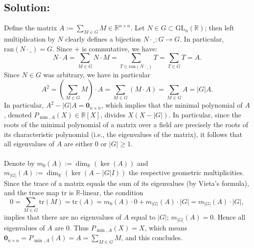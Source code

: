 \documentclass[11pt, a4paper, oneside]{article}
\newcommand{\solution}[1][]{\subsection*{#1}\hfill \par}
\theoremstyle{remark}
\theoremstyle{lemma}
\begin{document}
\solution[Solution:]
Define the matrix \( A := \sum_{M \in G} M \in \mathbb{R}^{n \times n} \). Let \( N \in G \subset \mathrm{GL}_n\left( \mathbb{R} \right) \); then left multiplication by \( N \) clearly defines a bijection \( N \cdot \_: G \rightarrow G \). In particular, \( \mathrm{ran}\left( N \cdot \_ \right) = G \). Since \( + \) is commutative, we have:
\[
N \cdot A = \sum_{M \in G} N \cdot M = \sum_{T \in \mathrm{ran}\left( N \cdot \_ \right)} T = \sum_{T \in G} T = A. 
\]
Since \( N \in G \) was arbitrary, we have in particular
\[
A^{2} = \left( \sum_{M \in G} M \right) \cdot A = \sum_{M \in G} \left( M \cdot A \right) = \sum_{M \in G} A = \left| G \right| A.
\]
In particular, \( A^{2} - \left| G \right| A = \mathbf{0}_{n \times n} \), which implies that the minimal polynomial of \( A \), denoted \( P_{\min, A}(X) \in \mathbb{R}[X] \), divides \( X\left( X - \left| G \right| \right) \). In particular, since the roots of the minimal polynomial of a matrix over a field are precisely the roots of its characteristic polynomial (i.e., the eigenvalues of the matrix), it follows that all eigenvalues of \( A \) are either \( 0 \) or \( \left| G \right| \geq 1 \).
\\\\
Denote by \( m_0(A) := \dim_{\mathbb{R}} \left( \ker\left( A \right) \right) \) and \( m_{\left| G \right|}(A) := \dim_{\mathbb{R}} \left( \ker\left( A - \left| G \right| I \right) \right) \) the respective geometric multiplicities. Since the trace of a matrix equals the sum of its eigenvalues (by Vieta’s formula), and the trace map \( \mathrm{tr} \) is \( \mathbb{R} \)-linear, the condition
\[
0 = \sum_{M \in G} \mathrm{tr}\left( M \right) = \mathrm{tr}\left( A \right) = m_{0}(A) \cdot 0 + m_{\left| G \right|}(A) \cdot \left| G \right| = m_{\left| G \right|}(A) \cdot \left| G \right|,
\]
implies that there are no eigenvalues of \(A\) equal to \( \left| G \right| \); \(m_{\left| G \right|}(A) = 0\). Hence all eigenvalues of \( A \) are \( 0 \). Thus \( P_{\min, A}(X) = X \), which means \( \mathbf{0}_{n \times n} = P_{\min, A}(A) = A = \sum_{M \in G} M\), and this concludes.
\newpage
\appendix
\section{}
\end{document}
